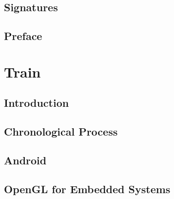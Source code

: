 






\newpage
\thispagestyle{empty}
\mbox{}


\chapter*{Signatures}


\newpage
\thispagestyle{empty}
\mbox{}

\chapter*{Preface}


\newpage
\thispagestyle{empty}
\mbox{}

\newpage
\thispagestyle{empty}
\mbox{}

\setcounter{secnumdepth}{3}
\setcounter{tocdepth}{1}

\tableofcontents*

\acresetall %



\part{Train}
\acresetall %

\chapter{Introduction}\label{chap:intro}


\chapter{Chronological Process} \label{chronologicalprocess}


\chapter{Android}


\chapter{OpenGL for Embedded Systems}



